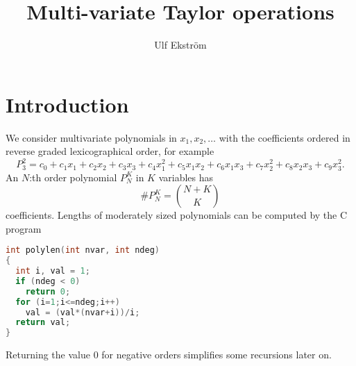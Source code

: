 \documentclass[11pt]{amsart}
\title{Multi-variate Taylor operations}
\author{Ulf Ekstr\"om}
\begin{document}
\maketitle


\section{Introduction}
We consider multivariate polynomials in $x_1, x_2, \ldots$ with the coefficients ordered in reverse graded lexicographical order, for example
\begin{equation}
  P_3^2 = c_0 + c_1 x_1 + c_2 x_2 + c_3 x_3 + c_4 x_1^2 + c_5 x_1 x_2 + c_6 x_1 x_3 + c_7 x_2^2 + c_8 x_2 x_3 + c_9 x_3^2.
\end{equation}
An $N$:th order polynomial $P^K_N$ in $K$ variables has 
\begin{equation}
\#P^K_N = {N+K \choose K}
\end{equation}
coefficients. Lengths of moderately sized polynomials can be computed by the C program
\begin{lstlisting}[language=C]
int polylen(int nvar, int ndeg)
{
  int i, val = 1;
  if (ndeg < 0)
    return 0;
  for (i=1;i<=ndeg;i++)
    val = (val*(nvar+i))/i;
  return val;
}
\end{lstlisting}
Returning the value 0 for negative orders simplifies some recursions
later on.

\clearpage
\end{document}

